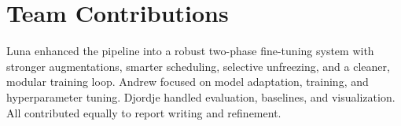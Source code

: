 \documentclass[11pt]{article}
\begin{document}



\section{Team Contributions}

Luna enhanced the pipeline into a robust two-phase fine-tuning system with stronger augmentations, smarter scheduling, selective unfreezing, and a cleaner, modular training loop. Andrew focused on model adaptation, training, and hyperparameter tuning. Djordje handled evaluation, baselines, and visualization. All contributed equally to report writing and refinement.
%

% 



\end{document}
